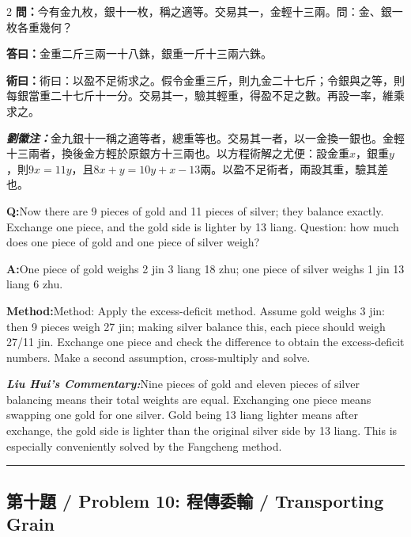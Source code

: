 \documentclass[11pt,a4paper]{article}
\newcommand{\cnwen}{\textcolor{cnlabelfg}{\textbf{問：}}}
\newcommand{\cnda}{\textbf{答曰：}}
\newcommand{\cnshu}{\textcolor{cnlabelfg}{\textbf{術曰：}}}
\newcommand{\cnzhu}{\textcolor{commentarycolor}{\textit{\textbf{劉徽注：}}}}
\newcommand{\enwen}{\textcolor{enlabelfg}{\textbf{Q:}}}
\newcommand{\enda}{\textcolor{enlabelfg}{\textbf{A:}}}
\newcommand{\enshu}{\textcolor{enlabelfg}{\textbf{Method:}}}
\newcommand{\enzhu}{\textcolor{enlabelfg}{\textit{\textbf{Liu Hui's Commentary:}}}}
\begin{document}
\begin{paracol}{2}
\switchcolumn[0]
\cnwen 今有金九枚，銀十一枚，稱之適等。交易其一，金輕十三兩。問：金、銀一枚各重幾何？

\cnda 金重二斤三兩一十八銖，銀重一斤十三兩六銖。

\cnshu 術曰：以盈不足術求之。假令金重三斤，則九金二十七斤；令銀與之等，則每銀當重二十七斤十一分。交易其一，驗其輕重，得盈不足之數。再設一率，維乘求之。

\cnzhu 金九銀十一稱之適等者，總重等也。交易其一者，以一金換一銀也。金輕十三兩者，換後金方輕於原銀方十三兩也。以方程術解之尤便：設金重$x$，銀重$y$，則$9x = 11y$，且$8x + y = 10y + x - 13$兩。以盈不足術者，兩設其重，驗其差也。

\switchcolumn[1]
\enwen Now there are 9 pieces of gold and 11 pieces of silver; they balance exactly. Exchange one piece, and the gold side is lighter by 13 liang. Question: how much does one piece of gold and one piece of silver weigh?

\enda One piece of gold weighs 2 jin 3 liang 18 zhu; one piece of silver weighs 1 jin 13 liang 6 zhu.

\enshu Method: Apply the excess-deficit method. Assume gold weighs 3 jin: then 9 pieces weigh 27 jin; making silver balance this, each piece should weigh 27/11 jin. Exchange one piece and check the difference to obtain the excess-deficit numbers. Make a second assumption, cross-multiply and solve.

\enzhu Nine pieces of gold and eleven pieces of silver balancing means their total weights are equal. Exchanging one piece means swapping one gold for one silver. Gold being 13 liang lighter means after exchange, the gold side is lighter than the original silver side by 13 liang. This is especially conveniently solved by the Fangcheng method.
\end{paracol}

\bigskip\hrule\bigskip

\subsection{第十題 / Problem 10: 程傳委輸 / Transporting Grain}
\end{document}
